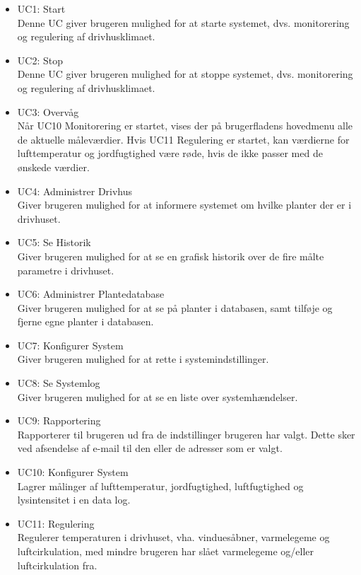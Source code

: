\begin{itemize}

\item UC1: Start \\
Denne UC giver brugeren mulighed for at starte systemet, dvs. monitorering og regulering af drivhusklimaet.

\item UC2: Stop \\
Denne UC giver brugeren mulighed for at stoppe systemet, dvs. monitorering og regulering af
drivhusklimaet.

\item UC3: Overvåg \\
Når UC10 Monitorering er startet, vises der på brugerfladens hovedmenu alle de aktuelle måleværdier. Hvis UC11 Regulering er startet, kan værdierne for lufttemperatur og jordfugtighed være røde, hvis de ikke passer med de ønskede værdier.

\item UC4: Administrer Drivhus \\
Giver brugeren mulighed for at informere systemet om hvilke planter der er i drivhuset.

\item UC5: Se Historik \\
Giver brugeren mulighed for at se en grafisk historik over de fire målte parametre i drivhuset.

\item UC6: Administrer Plantedatabase \\
Giver brugeren mulighed for at se på planter i databasen, samt tilføje og fjerne egne planter i databasen.

\item UC7: Konfigurer System \\
Giver brugeren mulighed for at rette i systemindstillinger.

\item UC8: Se Systemlog \\
Giver brugeren mulighed for at se en liste over systemhændelser.

\item UC9: Rapportering \\
Rapporterer til brugeren ud fra de indstillinger brugeren har valgt. Dette sker ved afsendelse af e-mail til den eller de adresser som er valgt. 

\item UC10: Konfigurer System \\
Lagrer målinger af lufttemperatur, jordfugtighed, luftfugtighed og lysintensitet i en
data log.

\item UC11: Regulering \\
Regulerer temperaturen i drivhuset, vha. vinduesåbner, varmelegeme og luftcirkulation, med mindre brugeren har slået varmelegeme og/eller luftcirkulation fra.

\end{itemize}


